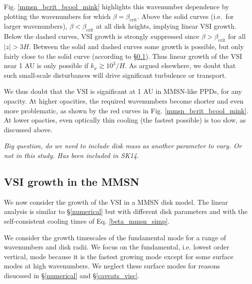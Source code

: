 Fig. \ref{mmsn_bcrit_bcool_mink} highlights this wavenumber dependence by plotting
the wavenumbers for which $\beta = \beta_\mathrm{crit}$.  Above the solid curves (i.e.\ for larger wavenumbers), $\beta <  \beta_\mathrm{crit}$ at all disk heights, implying linear VSI growth.  Below the dashed curves, VSI growth is strongly suppressed since $\beta >  \beta_\mathrm{crit}$ for all $|z| > 3H$.  Between the solid and dashed curves some growth is possible, but only fairly close to the solid curve (according to \S\ref{vsi_mmsn_grow}).  Thus linear growth of the VSI near 1 AU is only possible if $k_x \gtrsim 10^3/H$.  As argued elsewhere, we doubt that such small-scale disturbances will drive significant turbulence or transport.

We thus doubt that the VSI is significant at 1 AU in MMSN-like PPDs, for any opacity.  At higher opacities, the required wavenumbers become shorter and even more problematic, as shown by the red curves in Fig. \ref{mmsn_bcrit_bcool_mink}.  At lower opacties, even optically thin cooling (the fastest possible) is too slow, as discussed above. 

\emph{Big question, do we need to include disk mass as another parameter to vary.  Or not in this study.  Has been included in SK14.}



\subsection{VSI growth in the MMSN}\label{vsi_mmsn_grow}
We now consider the growth of the VSI in a MMSN disk model.  The linear analysis is similar to 
\S\ref{numerical} but with different disk parameters and with the self-consistent cooling times of 
Eq. \ref{beta_mmsn_simp}. 

We consider the growth timescales of the fundamental mode for a range of
wavenumbers and disk radii. We focus on the fundamental, i.e. lowest order vertical, mode 
because it is the fastest growing mode except for some surface modes at high 
wavenumbers.   We neglect these surface modes for reasons disucssed in \S\ref{numerical} and \S\ref{caveats_visc}.


